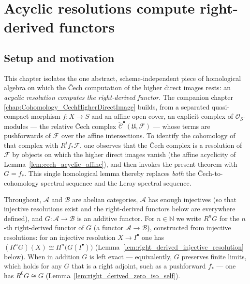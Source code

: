 \chapter{Acyclic resolutions compute right-derived functors}
\label{chap:Cohomology_AcyclicResolution}

\section{Setup and motivation}

This chapter isolates the one abstract, scheme-independent piece of homological
algebra on which the {\v C}ech computation of the higher direct images rests: an
\emph{acyclic resolution computes the right-derived functor}. The companion chapter
\ref{chap:Cohomology_CechHigherDirectImage} builds, from a separated quasi-compact
morphism \(f : X \to S\) and an affine open cover, an explicit complex of
\(\mathcal{O}_S\)-modules --- the relative {\v C}ech complex
\(\check{\mathcal{C}}^\bullet(\mathfrak{U}, \mathcal{F})\) --- whose terms are
pushforwards of \(\mathcal{F}\) over the affine intersections. To identify the
cohomology of that complex with \(R^i f_*\mathcal{F}\), one observes that the
{\v C}ech complex is a resolution of \(\mathcal{F}\) by objects on which the higher
direct images vanish (the affine acyclicity of
Lemma~\ref{lem:cech_acyclic_affine}), and then invokes the present theorem with
\(G = f_*\). This single homological lemma thereby replaces \emph{both} the
{\v C}ech-to-cohomology spectral sequence and the Leray spectral sequence.

Throughout, \(\mathcal{A}\) and \(\mathcal{B}\) are abelian categories,
\(\mathcal{A}\) has enough injectives (so that injective resolutions exist and the
right-derived functors below are everywhere defined), and
\(G : \mathcal{A} \to \mathcal{B}\) is an additive functor. For \(n \in \mathbb{N}\)
we write \(R^n G\) for the \(n\)-th right-derived functor of \(G\)
(a functor \(\mathcal{A} \to \mathcal{B}\)), constructed from injective resolutions:
for an injective resolution \(X \to I^\bullet\) one has
\((R^n G)(X) \cong H^n\bigl(G(I^\bullet)\bigr)\)
(Lemma~\ref{lem:right_derived_injective_resolution} below). When in addition \(G\) is
left exact --- equivalently, \(G\) preserves finite limits, which holds for any \(G\)
that is a right adjoint, such as a pushforward \(f_*\) --- one has \(R^0 G \cong G\)
(Lemma~\ref{lem:right_derived_zero_iso_self}).


